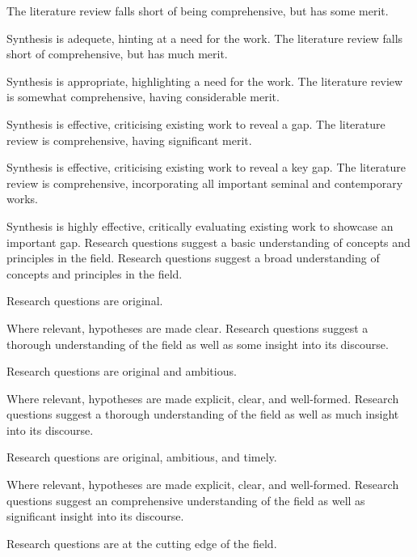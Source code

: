\begin{markingrubric}
        \grade \fail 
        	\par 
        \grade The literature review falls short of being comprehensive, but has some merit.
        	\par  Synthesis is adequete, hinting at a need for the work.
        \grade The literature review falls short of comprehensive, but has much merit.
        	\par  Synthesis is appropriate, highlighting a need for the work.
        \grade The literature review is somewhat comprehensive, having considerable merit.
        	\par  Synthesis is effective, criticising existing work to reveal a gap.
        \grade The literature review is comprehensive, having significant merit.
        	\par Synthesis is effective, criticising existing work to reveal a key gap.
        \grade The literature review is comprehensive, incorporating all important seminal and contemporary works.
        	\par Synthesis is highly effective, critically evaluating existing work to showcase an important gap.
            \grade\fail 
        \grade 		Research questions suggest a basic understanding of concepts and principles in the field.
        \grade 		Research questions suggest a broad understanding of concepts and principles in the field.
        \par		Research questions are original.
        \par		Where relevant, hypotheses are made clear.
        \grade 		Research questions suggest a thorough understanding of the field as well as some insight into its discourse.
        \par		Research questions are original and ambitious.
      \par		Where relevant, hypotheses are made explicit, clear, and well-formed.
        \grade 		Research questions suggest a thorough understanding of the field as well as much insight into its discourse.
        \par		Research questions are original, ambitious, and timely.
      \par		Where relevant, hypotheses are made explicit, clear, and well-formed.
        \grade 		Research questions suggest an comprehensive understanding of the field as well as significant insight into its discourse.
        \par		Research questions are at the cutting edge of the field.

\end{markingrubric}
